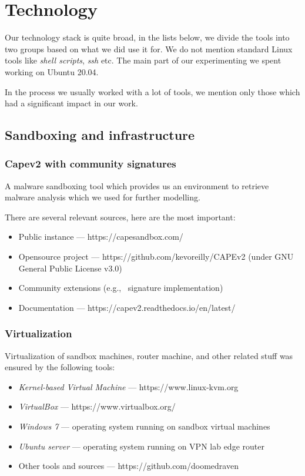 \chapter{Technology} \label{app:technologies}
Our technology stack is quite broad, in the lists below, we divide the tools into two groups based on what we did use it for. We do not mention standard Linux tools like \emph{shell scripts}, \emph{ssh} etc. The main part of our experimenting we spent working on Ubuntu 20.04.

In the process we usually worked with a lot of tools, we mention only those which had a significant impact in our work.


\section*{Sandboxing and infrastructure}
\subsection*{Capev2 with community signatures}
A malware sandboxing tool which provides us an environment to retrieve malware analysis which we used for further modelling. 

There are several relevant sources, here are the most important:
\begin{itemize}
  \itemsep0em 
  \item Public instance --- https://capesandbox.com/
  \item Opensource project ---  https://github.com/kevoreilly/CAPEv2 (under GNU General Public License v3.0)
  \item Community extensions (e.g., \ signature implementation)
  \item Documentation --- https://capev2.readthedocs.io/en/latest/
\end{itemize}

\subsection*{Virtualization}
Virtualization of sandbox machines, router machine, and other related stuff was ensured by the following tools:
\begin{itemize}
  \itemsep0em 
  \item \emph{Kernel-based Virtual Machine} --- https://www.linux-kvm.org
  \item \emph{VirtualBox} --- https://www.virtualbox.org/
  \item \emph{Windows 7} --- operating system running on sandbox virtual machines
  \item \emph{Ubuntu server} --- operating system running on VPN lab edge router
  \item Other tools and sources --- https://github.com/doomedraven
\end{itemize}

